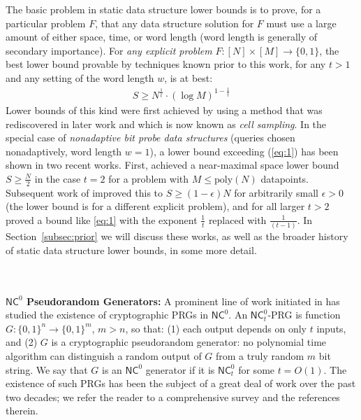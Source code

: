 \documentclass[11pt]{article}
\newcommand{\B}{\{0,1\}}
\newcommand{\poly}{\mathrm{poly}}
\begin{document}
The basic problem in static data structure lower bounds is to prove, for a particular problem $F$, that any data structure solution for $F$ must use a large amount of either space, time, or word length (word length is generally of secondary importance). 
For \emph{any explicit problem} $F: [N] \times [M] \to \B$, the best lower bound provable by techniques known prior to this work, for any $t>1$ and any setting of the word length $w$, is at best:
\begin{gather}
  S \geq N^{\frac{1}{t}} \cdot (\log M)^{1 - \frac{1}{t}}   \label{eq:1}
\end{gather}
Lower bounds of this kind were first achieved by \cite{Siegel89} using a method that was rediscovered in later work and which is now known as \emph{cell sampling}.
In the special case of \emph{nonadaptive bit probe data structures} (queries chosen nonadaptively, word length $w=1$), a lower bound exceeding (\ref{eq:1}) has been shown in two recent works. First, \cite{viola-maximal} achieved a near-maximal space lower bound $S \geq \frac{N}{2}$ in the case $t=2$ for a problem with $M \leq \poly(N)$ datapoints. Subsequent work of \cite{golovnev} improved this to $S \geq (1-\epsilon)N$ for arbitrarily small $\epsilon>0$ (the lower bound is for a different explicit problem), and for all larger $t>2$ proved a bound like \ref{eq:1} with the exponent $\frac{1}{t}$ replaced with $\frac{1}{(t-1)}$. In Section~\ref{subsec:prior} we will discuss these works, as well as the broader history of static data structure lower bounds, in some more detail.

~\\~\\
{\bf \noindent $\mathsf{NC}^0$ Pseudorandom Generators:} 
A prominent line of work initiated in \cite{goldreich-prg,cryan-miltersen}
has studied the existence of cryptographic PRGs in $\mathsf{NC}^0$. An $\mathsf{NC}^0_t$-PRG is function $G: \B^n \to \B^m$, $m > n$, so that: (1) each output depends on only $t$ inputs, and (2) $G$ is a cryptographic pseudorandom generator: no polynomial time algorithm can distinguish a random output of $G$ from a truly random $m$ bit string.
We say that $G$ is an $\mathsf{NC}^0$ generator if it is $\mathsf{NC}^0_t$ for some $t = O(1)$. 
The existence of such PRGs has been the subject of a great deal of work over the past two decades; we refer the reader to a comprehensive survey \cite{apple-survey} and the references therein. 
\end{document}
